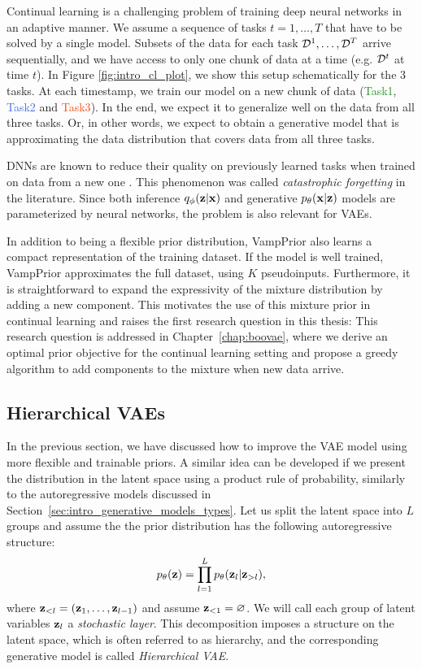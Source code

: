 Continual learning is a challenging problem of training deep neural networks in an adaptive manner. We assume a sequence of tasks $t=1,\dots,T$ that have to be solved by a single model.
Subsets of the data for each task $\mathcal{D}^1, \dots ,\mathcal{D}^T$ arrive sequentially, and we have access to only one chunk of data at a time (e.g. $\mathcal{D}^t$ at time $t$). In Figure \ref{fig:intro_cl_plot}, we show this setup schematically for the 3 tasks. At each timestamp, we train our model on a new chunk of data (\textcolor{ForestGreen}{Task1}, \textcolor{RoyalBlue}{Task2} and \textcolor{OrangeRed}{Task3}). In the end, we expect it to generalize well on the data from all three tasks. Or, in other words, we expect to obtain a generative model that is approximating the data distribution that covers data from all three tasks.   

DNNs are known to reduce their quality on previously learned tasks when trained on data from a new one \citep{kirkpatrick2017overcoming}. This phenomenon was called \textit{catastrophic forgetting} \citep{mccloskey1989catastrophic} in the literature. Since both inference ${q_{\phi}({\mathbf{z}}|{\mathbf{x}})}$ and generative ${p_{\theta}({\mathbf{x}}|{\mathbf{z}})}$ models are parameterized by neural networks, the problem is also relevant for VAEs.  

In addition to being a flexible prior distribution, VampPrior also learns a compact representation of the training dataset. If the model is well trained, VampPrior approximates the full dataset, using $K$ pseudoinputs. 
Furthermore, it is straightforward to expand the expressivity of the mixture distribution by adding a new component.
This motivates the use of this mixture prior in continual learning and raises the first research question in this thesis:
This research question is addressed in Chapter~\ref{chap:boovae}, where we derive an optimal prior objective for the continual learning setting and propose a greedy algorithm to add components to the mixture when new data arrive. 

\subsection{Hierarchical VAEs}
In the previous section, we have discussed how to improve the VAE model using more flexible and trainable priors.
A similar idea can be developed if we present the distribution in the latent space using a product rule of probability, similarly to the autoregressive models discussed in Section~\ref{sec:intro_generative_models_types}. Let us split the latent space into $L$ groups and assume the the prior distribution has the following autoregressive structure:
\begin{equation}
    p_{\theta}({\mathbf{z}}) = \prod_{l=1}^L p_{\theta}({\mathbf{z}}_l|{\mathbf{z}}_{>l}),
\end{equation}
where ${\mathbf{z}}_{<l} = ({\mathbf{z}}_1, \dots, {\mathbf{z}}_{l-1})$ and assume ${\mathbf{z}}_{<1} = \varnothing$. We will call each group of latent variables ${\mathbf{z}}_l$ a \textit{stochastic layer}. This decomposition imposes a structure on the latent space, which is often referred to as hierarchy, and the corresponding generative model is called \textit{Hierarchical VAE}. 

